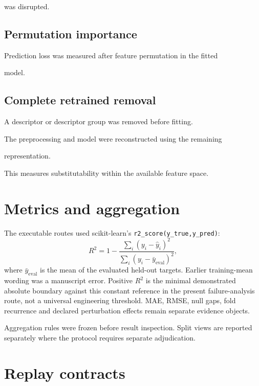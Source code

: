 \documentclass[11pt,a4paper,oneside]{report}
\begin{document}
was disrupted.





\subsection{Permutation importance}



Prediction loss was measured after feature permutation in the fitted

model.





\subsection{Complete retrained removal}



A descriptor or descriptor group was removed before fitting.



The preprocessing and model were reconstructed using the remaining

representation.



This measures substitutability within the available feature space.





\section{Metrics and aggregation}

The executable routes used scikit-learn's \texttt{r2\_score(y\_true,y\_pred)}:
\[
R^2=1-\frac{\sum_i(y_i-\hat y_i)^2}{\sum_i(y_i-\bar y_{\mathrm{eval}})^2},
\]
where $\bar y_{\mathrm{eval}}$ is the mean of the evaluated held-out targets. Earlier
training-mean wording was a manuscript error. Positive $R^2$ is the minimal
demonstrated absolute boundary against this constant reference in the present
failure-analysis route, not a universal engineering threshold. MAE, RMSE, null gaps,
fold recurrence and declared perturbation effects remain separate evidence objects.

Aggregation rules were frozen before result inspection. Split views are reported
separately where the protocol requires separate adjudication.

\section{Replay contracts}
\end{document}
